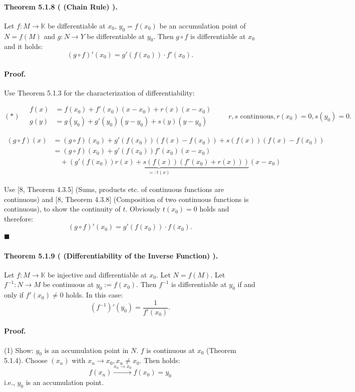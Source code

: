 \documentclass[12pt]{article}
\newcommand{\K}{\mathbb{K}} %
\newcommand{\NumberedTheorem}[3]{%
\paragraph*{Theorem #1 ( #2 ).} #3\par}
\begin{document}
\NumberedTheorem{5.1.8}{(Chain Rule)}{Let $f : M \to \K$ be differentiable at $x_0$, $y_0 = f(x_0)$ be an accumulation point of $N = f(M)$ and $g : N \to Y$ be differentiable at $y_0$. Then $g \circ f$ is differentiable at $x_0$ and it holds:
\[
(g \circ f)'(x_0) = g'(f(x_0)) \cdot f'(x_0).
\]
}

\paragraph*{Proof.} Use Theorem 5.1.3 for the characterization of differentiability:

\[
(*) \quad
\begin{aligned}
f(x) &= f(x_0) + f'(x_0)(x - x_0) + r(x)(x - x_0) \\
g(y) &= g(y_0) + g'(y_0)(y - y_0) + s(y)(y - y_0)
\end{aligned}
\qquad r, s \text{ continuous}, r(x_0) = 0, s(y_0) = 0.
\]

\begin{align*}
(g \circ f)(x) &= (g \circ f)(x_0) + g'(f(x_0))(f(x) - f(x_0)) + s(f(x))(f(x) - f(x_0)) \\
&= (g \circ f)(x_0) + g'(f(x_0))f'(x_0)(x - x_0) \\
&\quad + \underbrace{(g'(f(x_0))r(x) + s(f(x))(f'(x_0) + r(x)))}_{=: t(x)}(x - x_0)
\end{align*}

Use [8, Theorem 4.3.5] (Sums, products etc. of continuous functions are continuous) and [8, Theorem 4.3.8] (Composition of two continuous functions is continuous), to show the continuity of $t$. Obviously $t(x_0) = 0$ holds and therefore:
\[
(g \circ f)'(x_0) = g'(f(x_0)) \cdot f(x_0).
\]
\hfill $\blacksquare$

\NumberedTheorem{5.1.9}{(Differentiability of the Inverse Function)}{Let $f : M \to \K$ be injective and differentiable at $x_0$. Let $N = f(M)$. Let $f^{-1} : N \to M$ be continuous at $y_0 := f(x_0)$. Then $f^{-1}$ is differentiable at $y_0$ if and only if $f'(x_0) \neq 0$ holds. In this case:
\[
(f^{-1})'(y_0) = \frac{1}{f'(x_0)}.
\]
}

\paragraph*{Proof.}

(1) Show: $y_0$ is an accumulation point in $N$. $f$ is continuous at $x_0$ (Theorem 5.1.4). Choose $(x_n)$ with $x_n \to x_0, x_n \neq x_0$. Then holds:
\[
f(x_n) \xrightarrow{x_n \to x_0} f(x_0) = y_0
\]
i.e., $y_0$ is an accumulation point.
\end{document}
